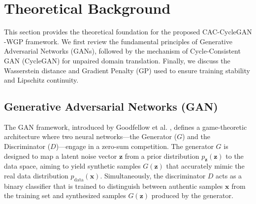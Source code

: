 \section{Theoretical Background}
\label{sec:background}

This section provides the theoretical foundation for the proposed CAC-CycleGAN \cite{wang2022gan_review_bearing}-WGP framework. We first review the fundamental principles of Generative Adversarial Networks (GANs), followed by the mechanism of Cycle-Consistent GAN (CycleGAN) for unpaired domain translation. Finally, we discuss the Wasserstein distance and Gradient Penalty (GP) used to ensure training stability and Lipschitz continuity.

\subsection{Generative Adversarial Networks (GAN)}
The GAN framework, introduced by Goodfellow et al. \cite{goodfellow2014gan}, defines a game-theoretic architecture where two neural networks—the Generator ($G$) and the Discriminator ($D$)—engage in a zero-sum competition. The generator $G$ is designed to map a latent noise vector $\boldsymbol{z}$ from a prior distribution $p_{\boldsymbol{z}}(\boldsymbol{z})$ to the data space, aiming to yield synthetic samples $G(\boldsymbol{z})$ that accurately mimic the real data distribution $p_{\text{data}}(\boldsymbol{x})$. Simultaneously, the discriminator $D$ acts as a binary classifier that is trained to distinguish between authentic samples $\boldsymbol{x}$ from the training set and synthesized samples $G(\boldsymbol{z})$ produced by the generator.

